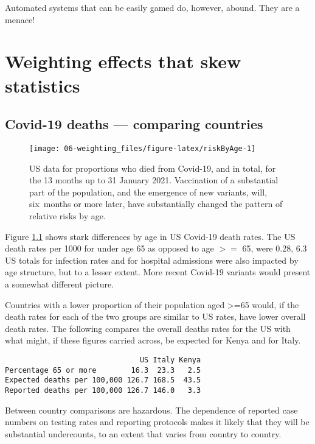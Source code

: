 \documentclass[
  10ptls,
  b5paper]{book}
\begin{document}
Automated systems that can be easily gamed do, however, abound. They are a menace!

\hypertarget{sec:yule1}{%
\chapter{Weighting effects that skew statistics}\label{sec:yule1}}

\hypertarget{covid-19-deaths-comparing-countries}{%
\section{Covid-19 deaths --- comparing countries}\label{covid-19-deaths-comparing-countries}}

\begin{figure}[H]

{\centering \texttt{[image: 06-weighting\_files/figure-latex/riskByAge-1]} 

}

\caption{US data for proportions who died from Covid-19, and in total,
for the 13 months up to 31 January 2021. Vaccination of a substantial 
part of the population, and the emergence of new variants, will,
six months or more later, have substantially changed the pattern
of relative risks by age.}\label{fig:riskByAge}
\end{figure}

Figure \ref{fig:riskByAge} shows stark differences by age in US Covid-19 death rates. The US death rates per 1000 for under age 65 as opposed to age \(>=\) 65, were 0.28, 6.3 US totals for infection rates and for hospital admissions were also impacted by age structure, but to a lesser extent. More recent Covid-19 variants would present a somewhat different picture.

Countries with a lower proportion of their population aged \textgreater=65 would, if the death rates for each of the two groups are similar to US rates, have lower overall death rates. The following compares the overall deaths rates for the US with what might, if these figures carried across, be expected for Kenya and for Italy.

\begin{verbatim}
                               US Italy Kenya
Percentage 65 or more        16.3  23.3   2.5
Expected deaths per 100,000 126.7 168.5  43.5
Reported deaths per 100,000 126.7 146.0   3.3
\end{verbatim}

Between country comparisons are hazardous. The dependence of reported case numbers on testing rates and reporting protocols makes it likely that they will be substantial undercounts, to an extent that varies from country to country.
\end{document}
